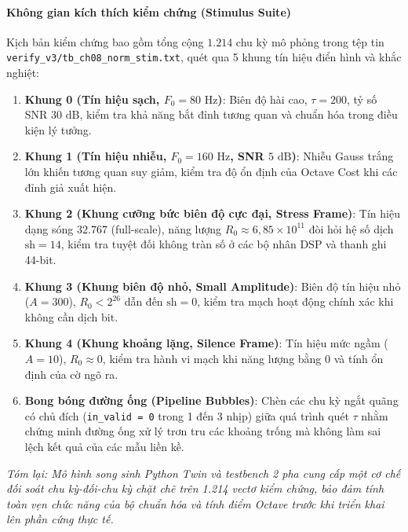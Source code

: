 \paragraph{Không gian kích thích kiểm chứng (Stimulus Suite)}
Kịch bản kiểm chứng bao gồm tổng cộng $1.214$ chu kỳ mô phỏng trong tệp tin \texttt{verify\_v3/tb\_ch08\_norm\_stim.txt}, quét qua 5 khung tín hiệu điển hình và khắc nghiệt:
\begin{enumerate}[leftmargin=1.5em]
    \item \textbf{Khung 0 (Tín hiệu sạch, $F_0 = 80\text{ Hz}$)}: Biên độ hài cao, $\tau = 200$, tỷ số SNR $30\text{ dB}$, kiểm tra khả năng bắt đỉnh tương quan và chuẩn hóa trong điều kiện lý tưởng.
    \item \textbf{Khung 1 (Tín hiệu nhiễu, $F_0 = 160\text{ Hz}$, SNR $5\text{ dB}$)}: Nhiễu Gauss trắng lớn khiến tương quan suy giảm, kiểm tra độ ổn định của Octave Cost khi các đỉnh giả xuất hiện.
    \item \textbf{Khung 2 (Khung cưỡng bức biên độ cực đại, Stress Frame)}: Tín hiệu dạng sóng $32.767$ (full-scale), năng lượng $R_0 \approx 6{,}85 \times 10^{11}$ đòi hỏi hệ số dịch $\text{sh} = 14$, kiểm tra tuyệt đối không tràn số ở các bộ nhân DSP và thanh ghi 44-bit.
    \item \textbf{Khung 3 (Khung biên độ nhỏ, Small Amplitude)}: Biên độ tín hiệu nhỏ ($A = 300$), $R_0 < 2^{26}$ dẫn đến $\text{sh} = 0$, kiểm tra mạch hoạt động chính xác khi không cần dịch bit.
    \item \textbf{Khung 4 (Khung khoảng lặng, Silence Frame)}: Tín hiệu mức ngầm ($A = 10$), $R_0 \approx 0$, kiểm tra hành vi mạch khi năng lượng bằng 0 và tính ổn định của cờ ngõ ra.
    \item \textbf{Bong bóng đường ống (Pipeline Bubbles)}: Chèn các chu kỳ ngắt quãng có chủ đích (\texttt{in\_valid = 0} trong 1 đến 3 nhịp) giữa quá trình quét $\tau$ nhằm chứng minh đường ống xử lý trơn tru các khoảng trống mà không làm sai lệch kết quả của các mẫu liền kề.
\end{enumerate}

\begin{tcolorbox}[colback=yellow!10!white,colframe=yellow!50!black,title={Kết quả chạy Icarus Verilog chu kỳ-đối-chu kỳ (Reviewer)}]
\end{tcolorbox}

\textit{Tóm lại: Mô hình song sinh Python Twin và testbench 2 pha cung cấp một cơ chế đối soát chu kỳ-đối-chu kỳ chặt chẽ trên 1.214 vectơ kiểm chứng, bảo đảm tính toàn vẹn chức năng của bộ chuẩn hóa và tính điểm Octave trước khi triển khai lên phần cứng thực tế.}

